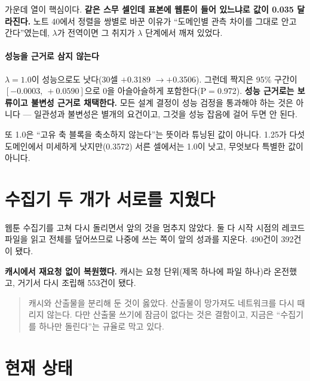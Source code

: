 \documentclass[10pt]{article}
\begin{document}
가운데 열이 핵심이다. \textbf{같은 스무 셀인데 표본에 웹툰이 들어 있느냐로 값이
0.035 달라진다.} 노트 40에서 정렬을 쌍별로 바꾼 이유가 ``도메인별 관측 차이를
그대로 안고 간다''였는데, $\lambda$가 전역이면 그 취지가 $\lambda$ 단계에서
깨져 있었다.


\paragraph{성능을 근거로 삼지 않는다}
$\lambda=1.0$이 성능으로도 낫다(30셀 $+$0.3189 $\to+$0.3506). 그런데 짝지은
95\% 구간이 $[-0.0003,\ +0.0590]$으로 0을 아슬아슬하게 포함한다(P$=$0.972).
\textbf{성능 근거로는 보류이고 불변성 근거로 채택한다.} 모든 설계 결정이 성능
검정을 통과해야 하는 것은 아니다 --- 일관성과 불변성은 별개의 요건이고, 그것을
성능 잡음에 걸어 두면 안 된다.

또 1.0은 ``고유 축 블록을 축소하지 않는다''는 뜻이라 튜닝된 값이 아니다.
1.25가 다섯 도메인에서 미세하게 낫지만(0.3572) 서른 셀에서는 1.0이 낫고,
무엇보다 특별한 값이 아니다.

\section{수집기 두 개가 서로를 지웠다}

웹툰 수집기를 고쳐 다시 돌리면서 앞의 것을 멈추지 않았다. 둘 다 시작 시점의
레코드 파일을 읽고 전체를 덮어쓰므로 나중에 쓰는 쪽이 앞의 성과를 지운다.
490건이 392건이 됐다.

\textbf{캐시에서 재요청 없이 복원했다.} 캐시는 요청 단위(제목 하나에 파일 하나)라
온전했고, 거기서 다시 조립해 553건이 됐다.

\begin{quote}\fontsize{9.5}{11.5}\selectfont
캐시와 산출물을 분리해 둔 것이 옳았다. 산출물이 망가져도 네트워크를 다시
때리지 않는다. 다만 산출물 쓰기에 잠금이 없다는 것은 결함이고, 지금은
``수집기를 하나만 돌린다''는 규율로 막고 있다.
\end{quote}

\section{현재 상태}
\end{document}
